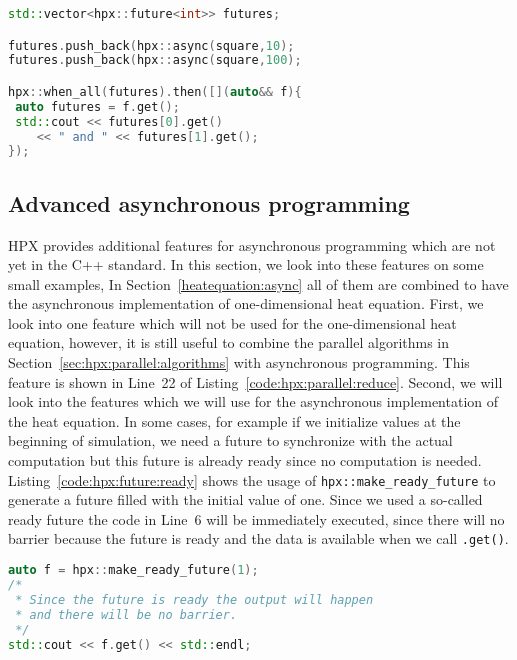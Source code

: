 \begin{lstlisting}[language=c++,caption={Advanced synchronization of futures using HPX.\label{code:hpx:future:sync}},float,floatplacement=htb]
std::vector<hpx::future<int>> futures;

futures.push_back(hpx::async(square,10);
futures.push_back(hpx::async(square,100);

hpx::when_all(futures).then([](auto&& f){
 auto futures = f.get();
 std::cout << futures[0].get() 
 	<< " and " << futures[1].get();
});
\end{lstlisting}

\subsection{Advanced asynchronous programming}
\label{sec:hpx:advanced:sync}
HPX provides additional features for asynchronous programming which are not yet in the C++ standard. In this section, we look into these features on some small examples, In Section~\ref{heatequation:async} all of them are combined to have the asynchronous implementation of one-dimensional heat equation. First, we look into one feature which will not be used for the one-dimensional heat equation, however, it is still useful to combine the parallel algorithms in Section~\ref{sec:hpx:parallel:algorithms} with asynchronous programming. This feature is shown in Line~22 of Listing~\ref{code:hpx:parallel:reduce}. Second, we will look into the features which we will use for the asynchronous implementation of the heat equation. In some cases, for example if we initialize values at the beginning of simulation, we need a future to synchronize with the actual computation but this future is already ready since no computation is needed. Listing~\ref{code:hpx:future:ready} shows the usage of \lstinline|hpx::make_ready_future| to generate a future filled with the initial value of one. Since we used a so-called ready future the code in Line~6 will be immediately executed, since there will no barrier because the future is ready and the data is available when we call \lstinline|.get()|.


\begin{lstlisting}[language=c++,caption={Use a ready future to initialize the computational data.\label{code:hpx:future:ready}},float,floatplacement=htb]
auto f = hpx::make_ready_future(1);
/* 
 * Since the future is ready the output will happen
 * and there will be no barrier.
 */
std::cout << f.get() << std::endl;
\end{lstlisting}

